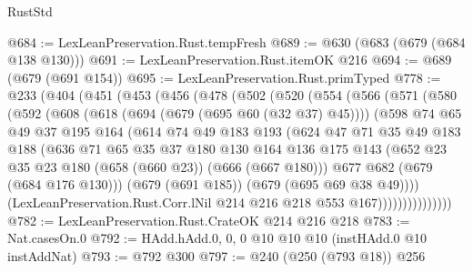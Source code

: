 \begin{lexlean}{RustStd}
\begin{coremodule}
@684 := LexLeanPreservation.Rust.tempFresh
@689 := @630 (@683 (@679 (@684 @138 @130)))
@691 := LexLeanPreservation.Rust.itemOK @216
@694 := @689 (@679 (@691 @154))
@695 := LexLeanPreservation.Rust.primTyped
@778 := @233
    (@404
      (@451
        (@453
          (@456
            (@478
              (@502
                (@520
                  (@554
                    (@566
                      (@571
                        (@580
                          (@592
                            (@608
                              (@618 (@694 (@679 (@695 @60 (@32 @37) @45))))
                              (@598
                                @74
                                @65
                                @49
                                @37
                                @195
                                @164
                                (@614
                                  @74
                                  @49
                                  @183
                                  @193
                                  (@624
                                    @47
                                    @71
                                    @35
                                    @49
                                    @183
                                    @188
                                    (@636
                                      @71
                                      @65
                                      @35
                                      @37
                                      @180
                                      @130
                                      @164
                                      @136
                                      @175
                                      @143
                                      (@652 @23 @35 @23 @180 (@658 (@660 @23)) (@666 (@667 @180)))
                                      @677
                                      @682
                                      (@679 (@684 @176 @130)))
                                    (@679 (@691 @185))
                                    (@679 (@695 @69 @38 @49))))
                                (LexLeanPreservation.Rust.Corr.lNil
                                  @214
                                  @216
                                  @218
                                  @553
                                  @167)))))))))))))))
@782 := LexLeanPreservation.Rust.CrateOK @214 @216 @218
@783 := Nat.casesOn.{0}
@792 := HAdd.hAdd.{0, 0, 0} @10 @10 @10 (instHAdd.{0} @10 instAddNat)
@793 := @792 @300
@797 := @240 (@250 (@793 @18)) @256

\end{coremodule}
\end{lexlean}
